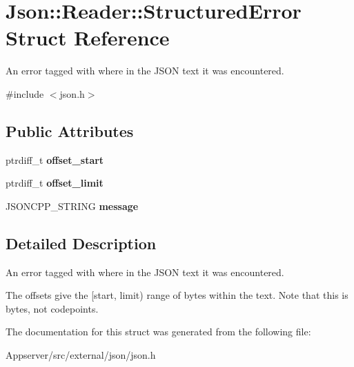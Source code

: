\hypertarget{structJson_1_1Reader_1_1StructuredError}{}\section{Json\+:\+:Reader\+:\+:Structured\+Error Struct Reference}
\label{structJson_1_1Reader_1_1StructuredError}


An error tagged with where in the J\+S\+ON text it was encountered.  




{\ttfamily \#include $<$json.\+h$>$}

\subsection*{Public Attributes}
\begin{DoxyCompactItemize}
\item 
ptrdiff\+\_\+t {\bfseries offset\+\_\+start}\hypertarget{structJson_1_1Reader_1_1StructuredError_ac98af0da2d704be4b64a9572a682423b}{}\label{structJson_1_1Reader_1_1StructuredError_ac98af0da2d704be4b64a9572a682423b}

\item 
ptrdiff\+\_\+t {\bfseries offset\+\_\+limit}\hypertarget{structJson_1_1Reader_1_1StructuredError_ad76ac01aeb0ada7e882c2df5daa54c6e}{}\label{structJson_1_1Reader_1_1StructuredError_ad76ac01aeb0ada7e882c2df5daa54c6e}

\item 
J\+S\+O\+N\+C\+P\+P\+\_\+\+S\+T\+R\+I\+NG {\bfseries message}\hypertarget{structJson_1_1Reader_1_1StructuredError_a2d2dc387aefe406a71de3daa263a38f4}{}\label{structJson_1_1Reader_1_1StructuredError_a2d2dc387aefe406a71de3daa263a38f4}

\end{DoxyCompactItemize}


\subsection{Detailed Description}
An error tagged with where in the J\+S\+ON text it was encountered. 

The offsets give the \mbox{[}start, limit) range of bytes within the text. Note that this is bytes, not codepoints. 

The documentation for this struct was generated from the following file\+:\begin{DoxyCompactItemize}
\item 
Appserver/src/external/json/json.\+h\end{DoxyCompactItemize}

